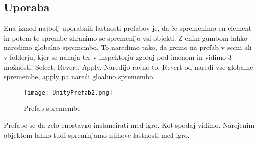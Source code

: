 {\color{indiagreen}\subsection{Uporaba}}
Ena izmed najbolj uporabnih lastnosti prefabov je, da če spremenimo en element in potem te sprembe shranimo se spremenijo vsi objekti. Z enim gumbom lahko naredimo globalno spremembo. To naredimo tako, da gremo na prefab v sceni ali v folderju, kjer se nahaja ter v inspektorju zgoraj pod imenom in vidimo 3 možnosti: Select, Revert, Apply. Naredijo ravno to. Revert od naredi vse globalne spremembe, apply pa naredi gloabno spremembo.
\begin{figure}[h]
	\centering
	\texttt{[image: UnityPrefab2.png]}
	\caption{Prefab spremembe}
\end{figure}
Prefabe se da zelo enostavno instancirati med igro. Kot spodaj vidimo. Narejenim objektom lahko tudi spreminjamo njihove lastnosti med igro.
